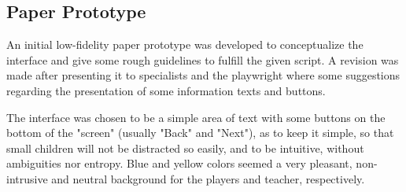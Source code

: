 \documentclass[runningheads]{llncs}
\begin{document}
\subsection{Paper Prototype}
\par An initial low-fidelity paper prototype was developed to conceptualize the interface and give some rough guidelines to fulfill the given script. A revision was made after presenting it to specialists and the playwright where some suggestions regarding the presentation of some information texts and buttons. 
\par The interface was chosen to be a simple area of text with some buttons on the bottom of the "screen" (usually "Back" and "Next"), as to keep it simple, so that small children will not be distracted so easily, and to be intuitive, without ambiguities nor entropy. Blue and yellow colors seemed a very pleasant, non-intrusive and neutral background for the players and teacher, respectively.
\end{document}

